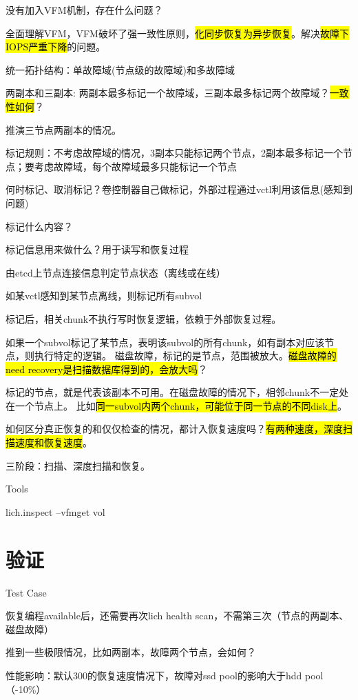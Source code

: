 没有加入VFM机制，存在什么问题？

全面理解VFM，VFM破坏了强一致性原则，\hl{化同步恢复为异步恢复}。解决\hl{故障下IOPS严重下降}的问题。

统一拓扑结构：单故障域(节点级的故障域)和多故障域

两副本和三副本: 两副本最多标记一个故障域，三副本最多标记两个故障域？\hl{一致性如何}？

推演三节点两副本的情况。

\begin{enumbox}
\item 标记规则：不考虑故障域的情况，3副本只能标记两个节点，2副本最多标记一个节点；要考虑故障域，每个故障域最多只能标记一个节点
\item 何时标记、取消标记？卷控制器自己做标记，外部过程通过vctl利用该信息(感知到问题)
\item 标记什么内容？
\item 标记信息用来做什么？用于读写和恢复过程
\item *
\item 由etcd上节点连接信息判定节点状态（离线或在线）
\item 如某vctl感知到某节点离线，则标记所有subvol
\end{enumbox}

标记后，相关chunk不执行写时恢复逻辑，依赖于外部恢复过程。

如果一个subvol标记了某节点，表明该subvol的所有chunk，如有副本对应该节点，则执行特定的逻辑。
磁盘故障，标记的是节点，范围被放大。\hl{磁盘故障的need recovery是扫描数据库得到的，会放大吗}？

标记的节点，就是代表该副本不可用。在磁盘故障的情况下，相邻chunk不一定处在一个节点上。
比如\hl{同一subvol内两个chunk，可能位于同一节点的不同disk上}。

如何区分真正恢复的和仅仅检查的情况，都计入恢复速度吗？\hl{有两种速度，深度扫描速度和恢复速度}。

三阶段：扫描、深度扫描和恢复。

Tools
\begin{enumbox}
\item lich.inspect --vfmget vol
\end{enumbox}

\section{验证}

Test Case
\begin{enumbox}
\item 恢复编程available后，还需要再次lich health scan，不需第三次（节点的两副本、磁盘故障）
\item 推到一些极限情况，比如两副本，故障两个节点，会如何？
\item 性能影响：默认300的恢复速度情况下，故障对ssd pool的影响大于hdd pool（-10\%）
\end{enumbox}

